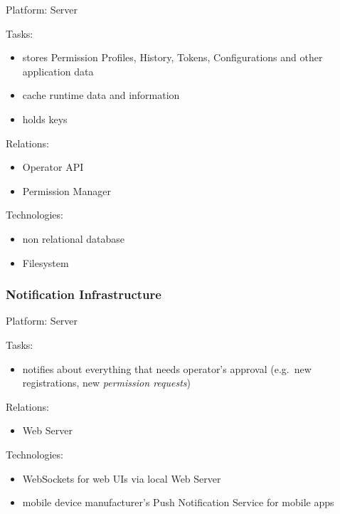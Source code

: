 \documentclass[12pt,english,a4paper,titlepage,cleardoublepage=empty,dottedtoc]{report}
\providecommand{\tightlist}{%
  \setlength{\itemsep}{0pt}\setlength{\parskip}{0pt}}
\begin{document}
Platform: Server

Tasks:

\begin{itemize}
\tightlist
\item
  stores Permission Profiles, History, Tokens, Configurations and other
  application data
\item
  cache runtime data and information
\item
  holds keys
\end{itemize}

Relations:

\begin{itemize}
\tightlist
\item
  Operator API
\item
  Permission Manager
\end{itemize}

Technologies:

\begin{itemize}
\tightlist
\item
  non relational database
\item
  Filesystem
\end{itemize}

\subsubsection*{Notification
Infrastructure}\label{notification-infrastructure}

Platform: Server

Tasks:

\begin{itemize}
\tightlist
\item
  notifies about everything that needs operator's approval (e.g.~new
  registrations, new \emph{permission requests})
\end{itemize}

Relations:

\begin{itemize}
\tightlist
\item
  Web Server
\end{itemize}

Technologies:

\begin{itemize}
\tightlist
\item
  WebSockets for web UIs via local Web Server
\item
  mobile device manufacturer's Push Notification Service for mobile apps
\end{itemize}
\end{document}
